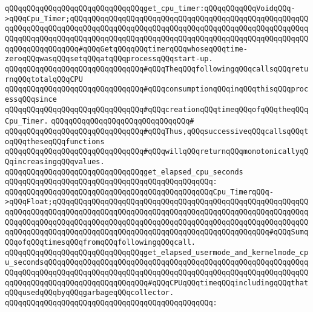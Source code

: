 \verb|qQQqqQQqqQQqqQQqqQQqqQQqqQQqqQQqget_cpu_timer:qQQqqQQqqQQqVoidqQQq->qQQqCpu_Timer;qQQqqQQqqQQqqQQqqQQqqQQqqQQqqQQqqQQqqQQqqQQqqQQqqQQqqQQqqQQqqQQqqQQqqQQqqQQqqQQqqQQqqQQqqQQqqQQqqQQqqQQqqQQqqQQqqQQqqQQqqQQqqQQqqQQqqQQqqQQqqQQqqQQqqQQqqQQqqQQqqQQqqQQqqQQqqQQqqQQqqQQqqQQqqQQqqQQqqQQqqQQqqQQqqQQq#qQQqGetqQQqqQQqtimerqQQqwhoseqQQqtime-zeroqQQqwasqQQqsetqQQqatqQQqprocessqQQqstart-up.|\newline
\newline
\newline
\newline
\verb|qQQqqQQqqQQqqQQqqQQqqQQqqQQqqQQq#qQQqTheqQQqfollowingqQQqcallsqQQqreturnqQQqtotalqQQqCPU|\newline
\verb|qQQqqQQqqQQqqQQqqQQqqQQqqQQqqQQq#qQQqconsumptionqQQqinqQQqthisqQQqprocessqQQqsince|\newline
\verb|qQQqqQQqqQQqqQQqqQQqqQQqqQQqqQQq#qQQqcreationqQQqtimeqQQqofqQQqtheqQQqCpu_Timer.|\newline
\verb|qQQqqQQqqQQqqQQqqQQqqQQqqQQqqQQq#|\newline
\verb|qQQqqQQqqQQqqQQqqQQqqQQqqQQqqQQq#qQQqThus,qQQqsuccessiveqQQqcallsqQQqtoqQQqtheseqQQqfunctions|\newline
\verb|qQQqqQQqqQQqqQQqqQQqqQQqqQQqqQQq#qQQqwillqQQqreturnqQQqmonotonicallyqQQqincreasingqQQqvalues.|\newline
\newline
\verb|qQQqqQQqqQQqqQQqqQQqqQQqqQQqqQQqget_elapsed_cpu_seconds|\newline
\verb|qQQqqQQqqQQqqQQqqQQqqQQqqQQqqQQqqQQqqQQqqQQqqQQq:|\newline
\verb|qQQqqQQqqQQqqQQqqQQqqQQqqQQqqQQqqQQqqQQqqQQqqQQqCpu_TimerqQQq->qQQqFloat;qQQqqQQqqQQqqQQqqQQqqQQqqQQqqQQqqQQqqQQqqQQqqQQqqQQqqQQqqQQqqQQqqQQqqQQqqQQqqQQqqQQqqQQqqQQqqQQqqQQqqQQqqQQqqQQqqQQqqQQqqQQqqQQqqQQqqQQqqQQqqQQqqQQqqQQqqQQqqQQqqQQqqQQqqQQqqQQqqQQqqQQqqQQqqQQqqQQqqQQqqQQqqQQqqQQqqQQqqQQqqQQqqQQqqQQqqQQqqQQqqQQqqQQqqQQqqQQqqQQq#qQQqSumqQQqofqQQqtimesqQQqfromqQQqfollowingqQQqcall.|\newline
\newline
\verb|qQQqqQQqqQQqqQQqqQQqqQQqqQQqqQQqget_elapsed_usermode_and_kernelmode_cpu_secondsqQQqqQQqqQQqqQQqqQQqqQQqqQQqqQQqqQQqqQQqqQQqqQQqqQQqqQQqqQQqqQQqqQQqqQQqqQQqqQQqqQQqqQQqqQQqqQQqqQQqqQQqqQQqqQQqqQQqqQQqqQQqqQQqqQQqqQQqqQQqqQQqqQQqqQQqqQQqqQQqqQQq#qQQqCPUqQQqtimeqQQqincludingqQQqthatqQQqusedqQQqbyqQQqgarbageqQQqcollector.|\newline
\verb|qQQqqQQqqQQqqQQqqQQqqQQqqQQqqQQqqQQqqQQqqQQqqQQq:|\newline
